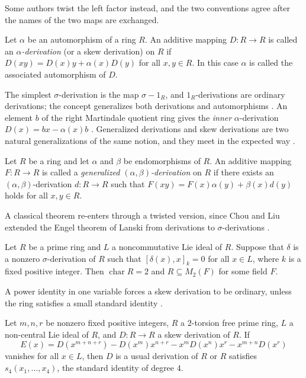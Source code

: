 Some authors twist the left factor instead, and the two conventions agree
after the names of the two maps are exchanged.

\begin{definition}\label{def:gen:alpha}
Let $\alpha$ be an automorphism of a ring $R$. An additive mapping
$D\colon R\to R$ is called an \emph{$\alpha$-derivation} (or a skew
derivation) on $R$ if $D(xy)=D(x)y+\alpha(x)D(y)$ for all $x,y\in R$. In
this case $\alpha$ is called the associated automorphism of $D$.
\end{definition}

The simplest $\sigma$-derivation is the map $\sigma-1_{R}$, and
$1_{R}$-derivations are ordinary derivations; the concept generalizes both
derivations and automorphisms \cite[p.~260]{ChouLiu2009}. An element $b$ of
the right Martindale quotient ring gives the \emph{inner} $\alpha$-derivation
$D(x)=bx-\alpha(x)b$ \cite[p.~885]{DeFilippisFosner2012}. Generalized
derivations and skew derivations are two natural generalizations of the same
notion, and they meet in the expected way \cite[p.~892]{Huang2018}.

\begin{definition}\label{def:gen:alphabeta-gen}
Let $R$ be a ring and let $\alpha$ and $\beta$ be endomorphisms of $R$. An
additive mapping $F\colon R\to R$ is called a \emph{generalized
$(\alpha,\beta)$-derivation} on $R$ if there exists an
$(\alpha,\beta)$-derivation $d\colon R\to R$ such that
$F(xy)=F(x)\alpha(y)+\beta(x)d(y)$ holds for all $x,y\in R$.
\end{definition}

A classical theorem re-enters through a twisted version, since Chou and Liu
extended the Engel theorem of Lanski from derivations to $\sigma$-derivations
\cite[p.~260]{ChouLiu2009}.

\begin{theorem}\label{thm:gen:chouliu-engel}
Let $R$ be a prime ring and $L$ a noncommutative Lie ideal of $R$. Suppose
that $\delta$ is a nonzero $\sigma$-derivation of $R$ such that
$[\delta(x),x]_{k}=0$ for all $x\in L$, where $k$ is a fixed positive
integer. Then $\operatorname{char}R=2$ and $R\subseteq M_{2}(F)$ for some
field $F$.
\end{theorem}

A power identity in one variable forces a skew derivation to be ordinary,
unless the ring satisfies a small standard identity
\cite[p.~886]{DeFilippisFosner2012}.
\begin{theorem}\label{thm:gen:defilippis-fosner}
Let $m,n,r$ be nonzero fixed positive integers, $R$ a $2$-torsion free prime
ring, $L$ a non-central Lie ideal of $R$, and $D\colon R\to R$ a skew
derivation of $R$. If
\[
E(x)=D(x^{m+n+r})-D(x^{m})x^{n+r}-x^{m}D(x^{n})x^{r}-x^{m+n}D(x^{r})
\]
vanishes for all $x\in L$, then $D$ is a usual derivation of $R$ or $R$
satisfies $s_{4}(x_{1},\dots,x_{4})$, the standard identity of degree $4$.
\end{theorem}

